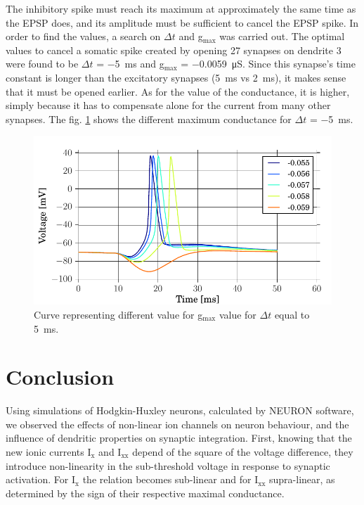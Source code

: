 \documentclass[a4paper, 10pt, conference]{ieeeconf}      %
\begin{document}
The inhibitory spike must reach its maximum at approximately the same time as the EPSP does, and its amplitude must be sufficient to cancel the EPSP spike. In order to find the values, a search on $\Delta t$ and g$_\text{max}$ was carried out. The optimal values to cancel a somatic spike created by opening 27 synapses on dendrite 3 were found to be $\Delta t$ = \SI{-5}{\milli\second} and g$_\text{max}$ = \SI{-0.0059}{\micro\siemens}. Since this synapse’s time constant is longer than the excitatory synapses (\SI{5}{\milli\second} vs \SI{2}{\milli\second}), it makes sense that it must be opened earlier. As for the value of the conductance, it is higher, simply because it has to compensate alone for the current from many other synapses. The fig. \ref{fig:2_1_4} shows the different maximum conductance for $\Delta t$ = \SI{-5}{\milli\second}.  

\begin{figure}
\begin{center}
\includegraphics[width=\columnwidth]{../figures/2_3-veto_spike.pdf}
\end{center}

\caption{Curve representing different value for g$_\text{max}$ value for $\Delta t$ equal to \SI{5}{\milli\second}.}
\label{fig:2_1_4}
\end{figure}






\section{Conclusion}
Using simulations of Hodgkin-Huxley neurons, calculated by NEURON software, we observed the effects of non-linear ion channels on neuron behaviour, and the influence of dendritic properties on synaptic integration. First, knowing that the new ionic currents I$_\text{x}$ and I$_\text{xx}$ depend of the square of the voltage difference, they introduce non-linearity in the sub-threshold voltage in response to synaptic activation. For I$_\text{x}$ the relation becomes sub-linear and for I$_\text{xx}$ supra-linear, as determined by the sign of their respective maximal conductance.
\end{document}

